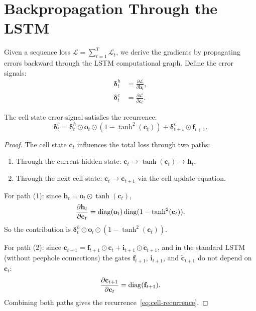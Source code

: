 \documentclass[11pt,a4paper]{article}
\begin{document}
\section{Backpropagation Through the LSTM}
\label{sec:bptt-lstm}

Given a sequence loss $\mathcal{L} = \sum_{t=1}^T \mathcal{L}_t$,
we derive the gradients by propagating errors backward through the
LSTM computational graph.  Define the error signals:
\begin{align}
  \boldsymbol{\delta}_t^h &= \frac{\partial \mathcal{L}}
    {\partial \mathbf{h}_t}, \label{eq:delta-h} \\
  \boldsymbol{\delta}_t^c &= \frac{\partial \mathcal{L}}
    {\partial \mathbf{c}_t}. \label{eq:delta-c}
\end{align}

\begin{theorem}
\label{thm:cell-gradient}
The cell state error signal satisfies the recurrence:
\begin{equation}
  \boxed{\boldsymbol{\delta}_t^c = \boldsymbol{\delta}_t^h \odot
    \mathbf{o}_t \odot (1 - \tanh^2(\mathbf{c}_t)) +
    \boldsymbol{\delta}_{t+1}^c \odot \mathbf{f}_{t+1}}.
  \label{eq:cell-recurrence}
\end{equation}
\end{theorem}

\begin{proof}
The cell state $\mathbf{c}_t$ influences the total loss through two
paths:
\begin{enumerate}[nosep]
  \item Through the current hidden state:
    $\mathbf{c}_t \to \tanh(\mathbf{c}_t) \to \mathbf{h}_t$.
  \item Through the next cell state:
    $\mathbf{c}_t \to \mathbf{c}_{t+1}$ via the cell update equation.
\end{enumerate}

For path (1): since $\mathbf{h}_t = \mathbf{o}_t \odot
\tanh(\mathbf{c}_t)$,
\[
  \frac{\partial \mathbf{h}_t}{\partial \mathbf{c}_t}
    = \operatorname{diag}(\mathbf{o}_t) \operatorname{diag}(1 - \tanh^2(\mathbf{c}_t)).
\]
So the contribution is $\boldsymbol{\delta}_t^h \odot \mathbf{o}_t
\odot (1 - \tanh^2(\mathbf{c}_t))$.

For path (2): since $\mathbf{c}_{t+1} = \mathbf{f}_{t+1} \odot
\mathbf{c}_t + \mathbf{i}_{t+1} \odot \tilde{\mathbf{c}}_{t+1}$,
and in the standard LSTM (without peephole connections) the gates
$\mathbf{f}_{t+1}$, $\mathbf{i}_{t+1}$, and
$\tilde{\mathbf{c}}_{t+1}$ do not depend on $\mathbf{c}_t$:
\[
  \frac{\partial \mathbf{c}_{t+1}}{\partial \mathbf{c}_t}
    = \operatorname{diag}(\mathbf{f}_{t+1}).
\]
Combining both paths gives the recurrence~\eqref{eq:cell-recurrence}.
\end{proof}
\end{document}
